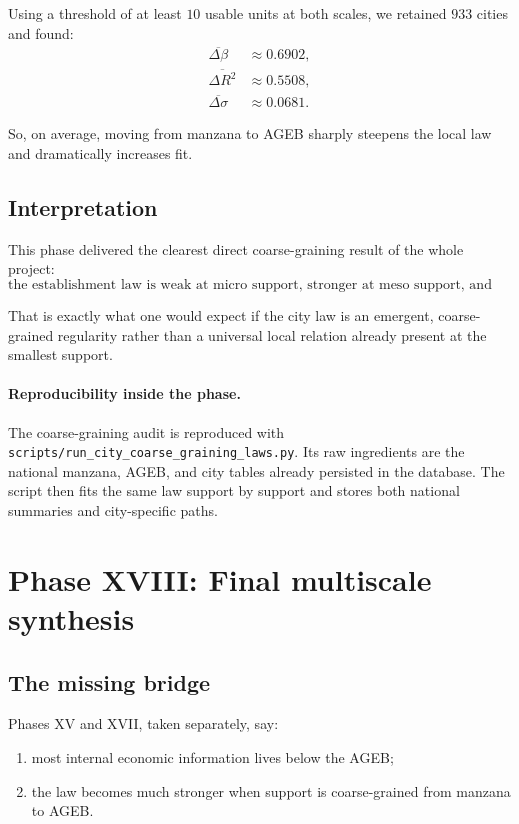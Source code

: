 \documentclass[11pt]{article}
\begin{document}
Using a threshold of at least \(10\) usable units at both scales, we retained \(933\) cities and found:
\begin{align}
\overline{\Delta \beta} &\approx 0.6902,\\
\overline{\Delta R^2} &\approx 0.5508,\\
\overline{\Delta \sigma} &\approx 0.0681.
\end{align}

So, on average, moving from manzana to AGEB sharply steepens the local law and dramatically increases fit.

\subsection{Interpretation}

This phase delivered the clearest direct coarse-graining result of the whole project:
\begin{equation}
\text{the establishment law is weak at micro support, stronger at meso support, and strongest at macro support.}
\end{equation}

That is exactly what one would expect if the city law is an emergent, coarse-grained regularity rather than a universal local relation already present at the smallest support.

\paragraph{Reproducibility inside the phase.}
The coarse-graining audit is reproduced with
\texttt{scripts/run\_city\_coarse\_graining\_laws.py}.
Its raw ingredients are the national manzana, AGEB, and city tables already persisted in the database. The script then fits the same law support by support and stores both national summaries and city-specific paths.

\section{Phase XVIII: Final multiscale synthesis}

\subsection{The missing bridge}

Phases XV and XVII, taken separately, say:
\begin{enumerate}[label=\arabic*.,leftmargin=2.0em]
\item most internal economic information lives below the AGEB;
\item the law becomes much stronger when support is coarse-grained from manzana to AGEB.
\end{enumerate}
\end{document}
